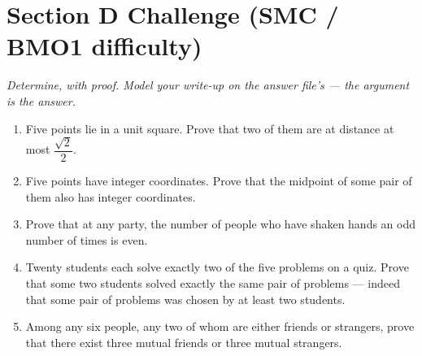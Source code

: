 \documentclass[11pt,a4paper]{article}
\begin{document}
\section*{Section D \quad Challenge \hfill{\normalfont\small(SMC / BMO1 difficulty)}}

\noindent\textit{Determine, with proof. Model your write-up on the answer file's --- the argument is the answer.}

\begin{enumerate}

\item Five points lie in a unit square. Prove that two of them are at distance at most $\dfrac{\sqrt2}{2}$.

\item Five points have integer coordinates. Prove that the midpoint of some pair of them also has integer coordinates.

\item Prove that at any party, the number of people who have shaken hands an odd number of times is even.

\item Twenty students each solve exactly two of the five problems on a quiz. Prove that some two students solved exactly the same pair of problems --- indeed that some pair of problems was chosen by at least two students.

\item Among any six people, any two of whom are either friends or strangers, prove that there exist three mutual friends or three mutual strangers.

\end{enumerate}

\end{document}
